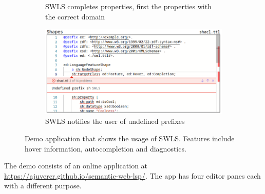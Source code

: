 \begin{figure}[tb]
\begin{subfigure}{0.48\textwidth}
      \caption{SWLS completes properties, first the properties with the correct domain}
      \label{property_completion}
    \end{subfigure}
    \hfill
    \begin{subfigure}{0.48\textwidth}
      \includegraphics[width=\textwidth]{./images/undefined.png}
      \caption{SWLS notifies the user of undefined prefixes}
      \label{undefined_prefix}
    \end{subfigure}
    \caption{
      Demo application that shows the usage of SWLS. Features include hover information, autocompletion and diagnostics.
    }\label{lst:Demo}
\end{figure}

The demo consists of an online application at \url{https://ajuvercr.github.io/semantic-web-lsp/}.
The app has four editor panes each with a different purpose.
%


